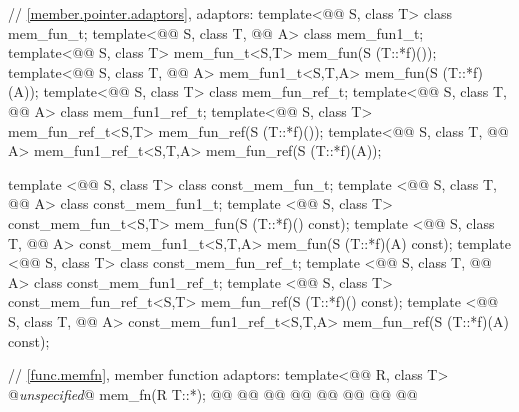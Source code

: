 \documentclass[american,twoside]{book}
\begin{document}
\begin{codeblock}
{  // \ref{member.pointer.adaptors}, adaptors:
  template<@@ S, class T> class mem_fun_t;
  template<@@ S, class T, @@ A> class mem_fun1_t;
  template<@@ S, class T>
      mem_fun_t<S,T> mem_fun(S (T::*f)());
  template<@@ S, class T, @@ A>
      mem_fun1_t<S,T,A> mem_fun(S (T::*f)(A));
  template<@@ S, class T> class mem_fun_ref_t;
  template<@@ S, class T, @@ A> class mem_fun1_ref_t;
  template<@@ S, class T>
      mem_fun_ref_t<S,T> mem_fun_ref(S (T::*f)());
  template<@@ S, class T, @@ A>
      mem_fun1_ref_t<S,T,A> mem_fun_ref(S (T::*f)(A));

  template <@@ S, class T> class const_mem_fun_t;
  template <@@ S, class T, @@ A> class const_mem_fun1_t;
  template <@@ S, class T>
    const_mem_fun_t<S,T> mem_fun(S (T::*f)() const);
  template <@@ S, class T, @@ A>
    const_mem_fun1_t<S,T,A> mem_fun(S (T::*f)(A) const);
  template <@@ S, class T> class const_mem_fun_ref_t;
  template <@@ S, class T, @@ A> class const_mem_fun1_ref_t;
  template <@@ S, class T>
    const_mem_fun_ref_t<S,T> mem_fun_ref(S (T::*f)() const);
  template <@@ S, class T, @@ A>
    const_mem_fun1_ref_t<S,T,A> mem_fun_ref(S (T::*f)(A) const);

  // \marktr{}\ref{func.memfn}, member function adaptors:
  template<@@ R, class T> @\textit{unspecified}@ mem_fn(R T::*);
  @@
    @@
  @@
    @@
  @@
    @@
  @@
    @@

}
\end{codeblock}
\end{document}

